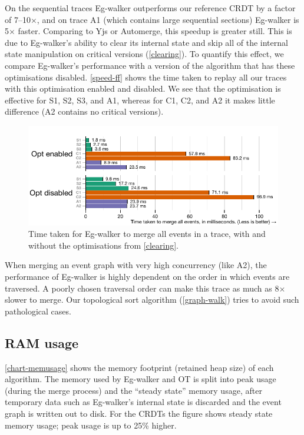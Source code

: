 \documentclass[sigplan,10pt]{acmart}
\newcommand{\algname}{Eg-walker\xspace}
\begin{document}
On the sequential traces \algname outperforms our reference CRDT by a factor of 7--10$\times$, and on trace A1 (which contains large sequential sections) \algname is 5$\times$ faster.
Comparing to Yjs or Automerge, this speedup is greater still.
This is due to \algname's ability to clear its internal state and skip all of the internal state manipulation on critical versions (\autoref{clearing}).
To quantify this effect, we compare \algname's performance with a version of the algorithm that has these optimisations disabled.
\autoref{speed-ff} shows the time taken to replay all our traces with this optimisation enabled and disabled.
We see that the optimisation is effective for S1, S2, S3, and A1, whereas for C1, C2, and A2 it makes little difference (A2 contains no critical versions).

\begin{figure}
  \includegraphics[width=\linewidth]{diagrams/ff.pdf}
  \caption{Time taken for \algname to merge all events in a trace, with and without the optimisations from \autoref{clearing}.}
  \label{speed-ff}
\end{figure}


When merging an event graph with very high concurrency (like A2), the performance of \algname is highly dependent on the order in which events are traversed.
A poorly chosen traversal order can make this trace as much as 8$\times$ slower to merge. Our topological sort algorithm (\autoref{graph-walk}) tries to avoid such pathological cases.

\subsection{RAM usage}

\autoref{chart-memusage} shows the memory footprint (retained heap size) of each algorithm.
The memory used by \algname and OT is split into peak usage (during the merge process) and the ``steady state'' memory usage, after temporary data such as \algname's internal state is discarded and the event graph is written out to disk.
For the CRDTs the figure shows steady state memory usage; peak usage is up to 25\% higher.
\end{document}
